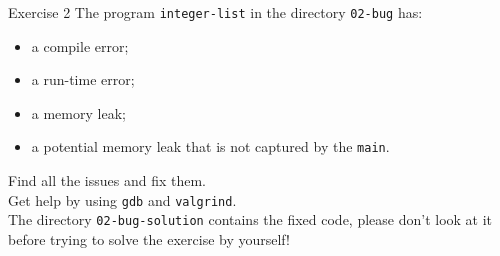 \documentclass[10pt]{beamer}
\begin{document}
\begin{frame}{Exercise 2}
The program \texttt{integer-list} in the directory \texttt{02-bug} has:

\begin{itemize}
    \item a compile error;
    \item a run-time error;
    \item a memory leak;
    \item a potential memory leak that is not captured by the \texttt{main}.
\end{itemize}
\vspace{0.5cm}
Find all the issues and fix them. \\[3mm]

Get help by using \texttt{gdb} and \texttt{valgrind}.\\[3mm]

The directory \texttt{02-bug-solution} contains the fixed code,
please don't look at it before trying to solve the exercise by yourself!
\end{frame}
\end{document}
